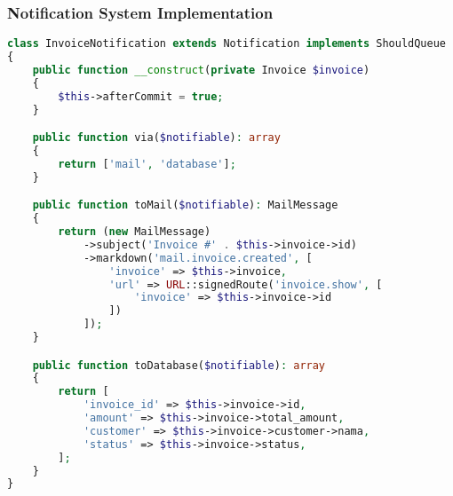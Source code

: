 \documentclass[a4paper]{report}
\begin{document}
\subsubsection{Notification System Implementation}
\begin{lstlisting}[language=PHP]
class InvoiceNotification extends Notification implements ShouldQueue
{
    public function __construct(private Invoice $invoice)
    {
        $this->afterCommit = true;
    }

    public function via($notifiable): array
    {
        return ['mail', 'database'];
    }

    public function toMail($notifiable): MailMessage
    {
        return (new MailMessage)
            ->subject('Invoice #' . $this->invoice->id)
            ->markdown('mail.invoice.created', [
                'invoice' => $this->invoice,
                'url' => URL::signedRoute('invoice.show', [
                    'invoice' => $this->invoice->id
                ])
            ]);
    }

    public function toDatabase($notifiable): array
    {
        return [
            'invoice_id' => $this->invoice->id,
            'amount' => $this->invoice->total_amount,
            'customer' => $this->invoice->customer->nama,
            'status' => $this->invoice->status,
        ];
    }
}
\end{lstlisting}
\end{document}
